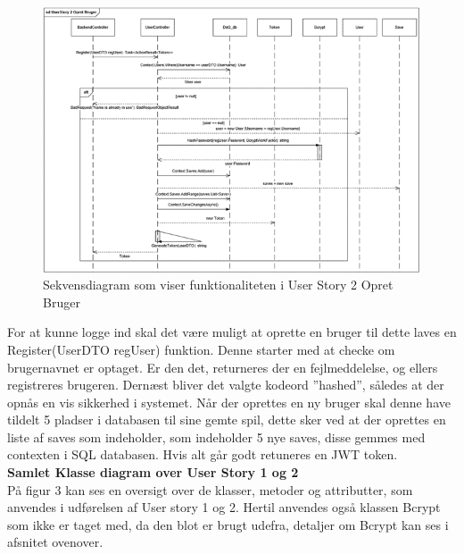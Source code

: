 \begin{figure}[H]
\centering
\includegraphics[width = \textwidth]{02-Body/Images/Backend_sekvens_2.PNG}
\caption{Sekvensdiagram som viser funktionaliteten i User Story 2 Opret Bruger}
\label{fig:Design-Backend-Sekvens-2}
\end{figure}

For at kunne logge ind skal det være muligt at oprette en bruger til dette laves en Register(UserDTO regUser) funktion. Denne starter med at checke om brugernavnet er optaget. Er den det, returneres der en fejlmeddelelse, og ellers registreres brugeren. Dernæst bliver det valgte kodeord ”hashed”, således at der opnås en vis sikkerhed i systemet. Når der oprettes en ny bruger skal denne have tildelt 5 pladser i databasen til sine gemte spil, dette sker ved at der oprettes en liste af saves som indeholder, som indeholder 5 nye saves, disse gemmes med contexten i SQL databasen. Hvis alt går godt retuneres en JWT token.\\

\textbf{Samlet Klasse diagram over User Story 1 og 2}\\

På figur 3 kan ses en oversigt over de klasser, metoder og attributter, som anvendes i udførelsen af User story 1 og 2. Hertil anvendes også klassen Bcrypt som ikke er taget med, da den blot er brugt udefra, detaljer om Bcrypt kan ses i afsnitet ovenover.\\

